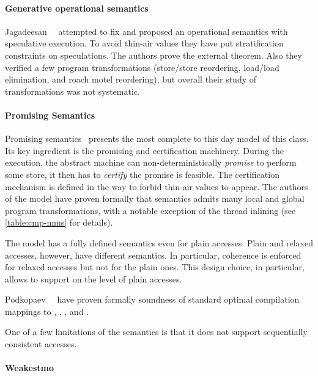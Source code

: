 \paragraph{Generative operational semantics}

Jagadeesan~\etal~\cite{Jagadeesan-al:ESOP10} attempted to fix \JMM 
and proposed an operational semantics with speculative execution.
To avoid thin-air values they have put stratification constraints 
on speculations. The authors prove the external \DRF theorem. 
Also they verified a few program transformations 
(store/store reordering, load/load elimination, and roach motel reordering), 
but overall their study of transformations was not systematic.  

\paragraph{Promising Semantics}

Promising semantics~\cite{Kang-al:POPL17, Lee-al:PLDI20} 
presents the most complete to this day model of this class. 
Its key ingredient is the promising and certification machinery.
During the execution, the abstract machine can 
non-deterministically \emph{promise} to perform some store,
it then has to \emph{certify} the promise is feasible. 
The certification mechanism is defined in the way to forbid thin-air values to appear.
The authors of the model have proven formally 
that \Promising semantics admits many local and global program transformations,
with a notable exception of the thread inlining
(see \cref{table:cmp-mms} for details).

The model has a fully defined semantics even for plain accesses.  
Plain and relaxed accesses, however, have different semantics.
In particular, coherence is enforced for relaxed accesses 
but not for the plain ones.  
This design choice, in particular, allows to support 
\CSE on the level of plain accesses. 

Podkopaev~\etal~\cite{Podkopaev-al:ECOOP17, Podkopaev-al:POPL19} have proven formally
soundness of standard optimal compilation mappings to \Intel, , , and \POWER.

One of a few limitations of the \Promising semantics is that 
it does not support sequentially consistent accesses. 

\paragraph{Weakestmo}

